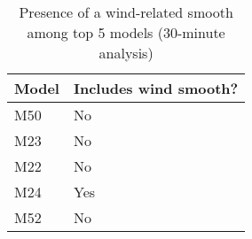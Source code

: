 \begin{table}

\caption{\label{tab:export-wind-smooth-presence}Presence of a wind-related smooth among top 5 models (30-minute analysis)}
\centering
\begin{tabular}[t]{ll}
\toprule
Model & Includes wind smooth?\\
\midrule
M50 & No\\
M23 & No\\
M22 & No\\
M24 & Yes\\
M52 & No\\
\bottomrule
\end{tabular}
\end{table}

